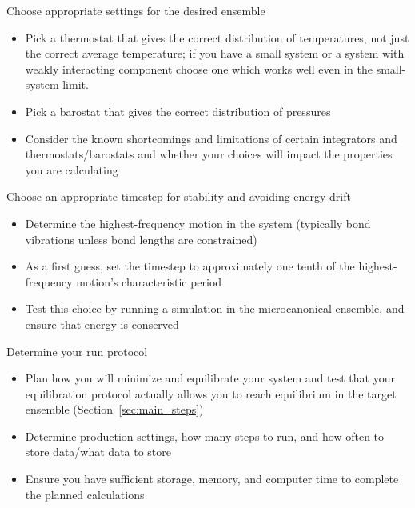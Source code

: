 \documentclass[9pt,bestpractices]{livecoms}
\begin{document}
\begin{Checklists*}[p!]
\begin{checklist}{Choose appropriate settings for the desired ensemble}
\begin{itemize}
\item Pick a thermostat that gives the correct distribution of temperatures, not just the correct average temperature; if you have a small system or a system with weakly interacting component choose one which works well even in the small-system limit.
\item Pick a barostat that gives the correct distribution of pressures
\item Consider the known shortcomings and limitations of certain integrators and thermostats/barostats and whether your choices will impact the properties you are calculating
\end{itemize}
\end{checklist}


\begin{checklist}{Choose an appropriate timestep for stability and avoiding energy drift}
\begin{itemize}
\item Determine the highest-frequency motion in the system (typically bond vibrations unless bond lengths are constrained)
\item As a first guess, set the timestep to approximately one tenth of the highest-frequency motion's characteristic period
\item Test this choice by running a simulation in the microcanonical ensemble, and ensure that energy is conserved
\end{itemize}
\end{checklist}

\begin{checklist}{Determine your run protocol}
\begin{itemize}
\item Plan how you will minimize and equilibrate your system and test that your equilibration protocol actually allows you to reach equilibrium in the target ensemble (Section~\ref{sec:main_steps})
\item Determine production settings, how many steps to run, and how often to store data/what data to store
\item Ensure you have sufficient storage, memory, and computer time to complete the planned calculations
\end{itemize}
\end{checklist}


\end{Checklists*}
\end{document}
